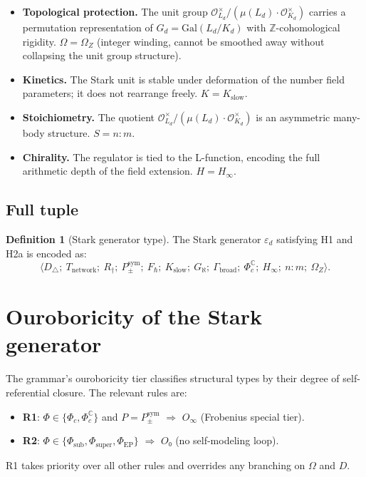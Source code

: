\documentclass[12pt]{article}
\theoremstyle{plain}
\theoremstyle{definition}
\newtheorem{definitioninner}[theoreminner]{Definition}
\theoremstyle{remark}
\newenvironment{definition}{\begin{mdframed}[style=defstyle]\begin{definitioninner}}{\end{definitioninner}\end{mdframed}}
\newcommand{\OO}{\mathcal{O}}
\newcommand{\bZ}{\mathbb{Z}}
\newcommand{\epsd}{\varepsilon_d}
\begin{document}
\begin{itemize}
  \item \textbf{Topological protection.} The unit group $\OO_{L_d}^\times / (\mu(L_d) \cdot
    \OO_{K_d}^\times)$ carries a permutation representation of $G_d = \mathrm{Gal}(L_d/K_d)$
    with $\bZ$-cohomological rigidity. $\Omega = \Omega_Z$ (integer winding, cannot be smoothed
    away without collapsing the unit group structure).

  \item \textbf{Kinetics.} The Stark unit is stable under deformation of the number field
    parameters; it does not rearrange freely. $K = K_\text{slow}$.

  \item \textbf{Stoichiometry.} The quotient $\OO_{L_d}^\times / (\mu(L_d) \cdot \OO_{K_d}^\times)$
    is an asymmetric many-body structure. $S = n{:}m$.

  \item \textbf{Chirality.} The regulator is tied to the L-function, encoding the full
    arithmetic depth of the field extension. $H = H_\infty$.
\end{itemize}

\subsection{Full tuple}

\begin{definition}[Stark generator type]
The Stark generator $\epsd$ satisfying H1 and H2a is encoded as:
$$\langle D_\triangle;\ T_\text{network};\ R_\dagger;\ P_{\pm}^{\text{sym}};\ F_\hbar;\
  K_\text{slow};\ G_\aleph;\ \Gamma_\text{broad};\ \Phi_c^\mathbb{C};\ H_\infty;\ n{:}m;\
  \Omega_Z \rangle.$$
\end{definition}

\section{Ouroboricity of the Stark generator}
\label{sec:ouroboricity}

The grammar's ouroboricity tier classifies structural types by their degree of self-referential
closure. The relevant rules are:
\begin{itemize}
  \item \textbf{R1}: $\Phi \in \{\Phi_c, \Phi_c^\mathbb{C}\}$ and $P = P_{\pm}^{\text{sym}}$
    $\Rightarrow$ $O_\infty$ (Frobenius special tier).
  \item \textbf{R2}: $\Phi \in \{\Phi_\text{sub}, \Phi_\text{super}, \Phi_\text{EP}\}$
    $\Rightarrow$ $O₀$ (no self-modeling loop).
\end{itemize}
R1 takes priority over all other rules and overrides any branching on $\Omega$ and $D$.
\end{document}
